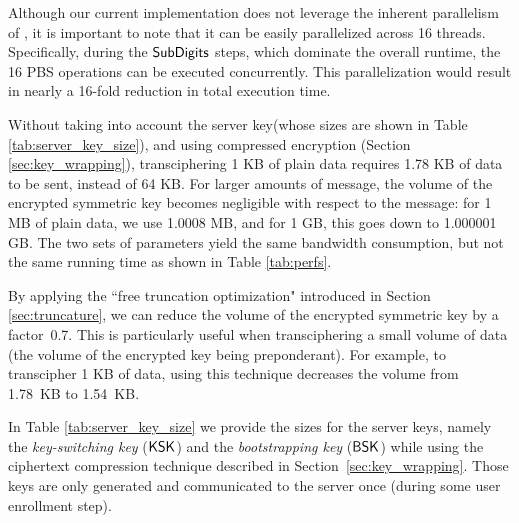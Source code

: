 Although our current implementation does not leverage the inherent parallelism of \coolName, it is important to note that it can be easily parallelized across 16 threads. Specifically, during the $\text{\textsf{SubDigits}}$ steps, which dominate the overall runtime, the 16 PBS operations can be executed concurrently. This parallelization would result in nearly a 16-fold reduction in total execution time.

Without taking into account the server key\ifeprint(whose sizes are shown in Table \ref{tab:server_key_size})\fi, and using compressed encryption (Section \ref{sec:key_wrapping}),  transciphering 1 KB of plain data requires 1.78 KB of data to be sent, instead of 64 KB. For larger amounts of message, the volume of the encrypted symmetric key becomes negligible with respect to the message: for 1 MB of plain data, we use 1.0008 MB, and for 1 GB, this goes down to 1.000001 GB. The two sets of parameters yield the same bandwidth consumption, but not the same running time as shown in Table \ref{tab:perfs}.



By applying the ``free truncation optimization" introduced in Section \ref{sec:truncature}, we can reduce the volume of the encrypted symmetric key by a factor~0.7. This is particularly useful when transciphering a small volume of data (the volume of the encrypted key being preponderant). For example, to transcipher 1 KB of data, using this technique decreases the volume from 1.78~KB to 1.54~KB. 

In Table \ref{tab:server_key_size} we provide the sizes for the server keys, namely the \emph{key-switching key} ($\textsf{KSK}$) and the \emph{bootstrapping key} ($\textsf{BSK}$) while using the ciphertext compression technique described in Section~\ref{sec:key_wrapping}. Those keys are only generated and communicated to the server once (during some user enrollment step).

\begin{table}[t!]
  \centering
  \caption{Size of the server keys for the two considered sets of parameters. 
    \label{tab:server_key_size}}
  
  \renewcommand{\arraystretch}{1.2}  %
\end{table}




